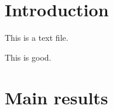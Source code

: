 \documentclass{article}
\begin{document}
\section{Introduction}%
\label{sec:introduction}


This is a text file. 


This is good. 



\section{Main results}%
\label{sec:main_results}
\end{document}

